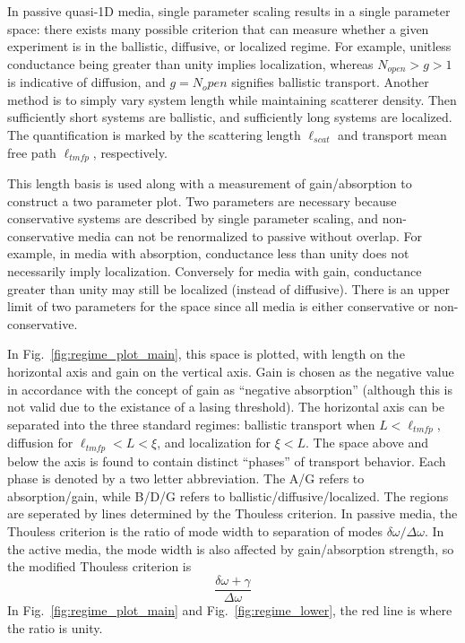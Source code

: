 In passive quasi-1D media, single parameter scaling results in a single parameter space: there exists many possible criterion that can measure whether a given experiment is in the ballistic, diffusive, or localized regime. For example, unitless conductance being greater than unity implies localization, whereas $N_{open}>g>1$ is indicative of diffusion, and $g=N_open$ signifies ballistic transport. Another method is to simply vary system length while maintaining scatterer density. Then sufficiently short systems are ballistic, and sufficiently long systems are localized. The quantification is marked by the scattering length $\ell_{scat}$ and transport mean free path $\ell_{tmfp}$, respectively.

This length basis is used along with a measurement of gain/absorption to construct a two parameter plot. Two parameters are necessary because conservative systems are described by single parameter scaling, and non-conservative media can not be renormalized to passive without overlap. For example, in media with absorption, conductance less than unity does not necessarily imply localization. Conversely for media with gain, conductance greater than unity may still be localized (instead of diffusive). There is an upper limit of two parameters for the space since all media is either conservative or non-conservative. 

In Fig.~\ref{fig:regime_plot_main}, this space is plotted, with length on the horizontal axis and gain on the vertical axis. Gain is chosen as the negative value in accordance with the concept of gain as ``negative absorption'' (although this is not valid due to the existance of a lasing threshold). The horizontal axis can be separated into the three standard regimes: ballistic transport when $L<\ell_{tmfp}$, diffusion for $\ell_{tmfp}<L<\xi$, and localization for $\xi<L$. The space above and below the axis is found to contain distinct ``phases'' of transport behavior. Each phase is denoted by a two letter abbreviation. The A/G refers to absorption/gain, while B/D/G refers to ballistic/diffusive/localized. The regions are seperated by lines determined by the Thouless criterion. In passive media, the Thouless criterion is the ratio of mode width to separation of modes $\delta \omega / \Delta \omega$. In the active media, the mode width is also affected by gain/absorption strength, so the modified Thouless criterion is
\begin{equation}
\frac{\delta \omega +\gamma}{\Delta \omega}
\end{equation}
In Fig.~\ref{fig:regime_plot_main} and Fig.~\ref{fig:regime_lower}, the red line is where the ratio is unity. 

